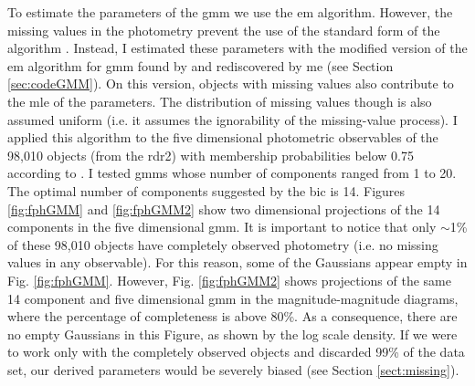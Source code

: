 To estimate the parameters of the \gls{gmm} we use the \gls{em} algorithm. However, the missing values in the photometry prevent the use of the standard form of the algorithm \cite[see for example Chapter 9 of][]{Bishop2006}.
Instead, I estimated these parameters with the modified version of the \gls{em} algorithm for \gls{gmm} found by \citet{McMichael1996} and rediscovered by me (see Section \ref{sec:codeGMM}). On this version, objects with missing values also contribute to the \gls{mle} of the parameters. The distribution of missing values though is also assumed uniform (i.e. it assumes the ignorability of the missing-value process). I applied this algorithm to the five dimensional photometric observables of the 98,010 objects (from the \gls{rdr2}) with membership probabilities below 0.75 according to \citet{Bouy2015}. I tested \glspl{gmm} whose number of components ranged from 1 to 20. The optimal number of components suggested by the \gls{bic} is 14. Figures \ref{fig:fphGMM} and \ref{fig:fphGMM2} show two dimensional projections of the 14 components in the five dimensional \gls{gmm}. It is important to notice that only $\sim$1\% of these 98,010 objects have completely observed photometry (i.e. no missing values in any observable). For this reason, some of the Gaussians appear empty in Fig. \ref{fig:fphGMM}. However, Fig. \ref{fig:fphGMM2} shows projections of the same 14 component and five dimensional \gls{gmm} in the magnitude-magnitude diagrams, where the percentage of completeness is above 80\%. As a consequence, there are no empty Gaussians in this Figure, as shown by the log scale density. If we were to work only with the completely observed objects and discarded 99\% of the data set, our derived parameters would be severely biased (see Section \ref{sect:missing}).

